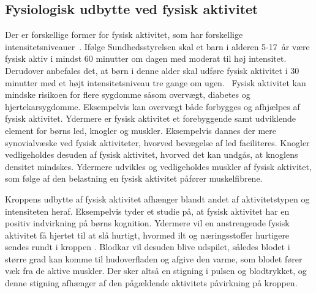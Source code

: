 \subsection{Fysiologisk udbytte ved fysisk aktivitet}\label{subsec:fysio_aktivitet}
Der er forskellige former for fysisk aktivitet, som har forskellige intensitetsniveauer~\citep{Academic2016a}. Ifølge Sundhedsstyrelsen skal et barn i alderen 5-17~år være fysisk aktiv i mindst 60 minutter om dagen med moderat til høj intensitet. Derudover anbefales det, at børn i denne alder skal udføre fysisk aktivitet i 30 minutter med et højt intensitetsniveau tre gange om ugen.~\citep{Sundhedsstyrelsen2016}\newline
Fysisk aktivitet kan mindske risikoen for flere sygdomme såsom overvægt, diabetes og hjertekarsygdomme. Eksempelvis kan overvægt både forbygges og afhjælpes af fysisk aktivitet. Ydermere er fysisk aktivitet et forebyggende samt udviklende element for børns led, knogler og muskler. Eksempelvis dannes der mere synovialvæske ved fysisk aktiviteter, hvorved bevægelse af led faciliteres. Knogler vedligeholdes desuden af fysisk aktivitet, hvorved det kan undgås, at knoglens densitet mindskes. Ydermere udvikles og vedligeholdes muskler af fysisk aktivitet, som følge af den belastning en fysisk aktivitet påfører muskelfibrene.~\citep{Academic2016a,Smith1991,Academic2016b,Cotman2007,CenterforDiseaseControlandPrevention2015}

Kroppens udbytte af fysisk aktivitet afhænger blandt andet af aktivitetstypen og intensiteten heraf. Eksempelvis tyder et studie på, at fysisk aktivitet har en positiv indvirkning på børns kognition. \citep{SibleyEtnier2003} Ydermere vil en anstrengende fysisk aktivitet få hjertet til at slå hurtigt, hvormed ilt og næringsstoffer hurtigere sendes rundt i kroppen \citep{Hjerteforeningen}. Blodkar vil desuden blive udspilet, således blodet i større grad kan komme til hudoverfladen og afgive den varme, som blodet fører væk fra de aktive muskler. Der sker altså en stigning i pulsen og blodtrykket, og denne stigning afhænger af den pågældende aktivitets påvirkning på kroppen. \citep{Martini2012,Stanfield2013,Berchtold2010}